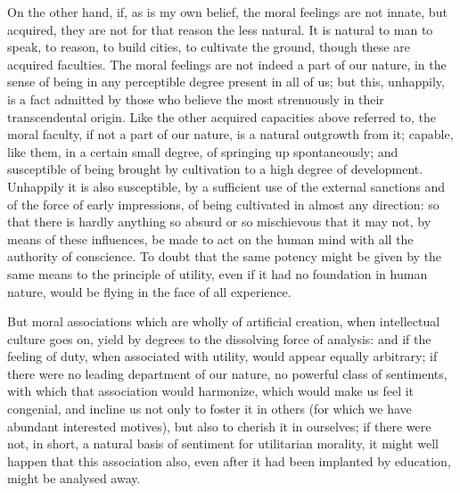 \documentclass[12pt]{report}
\begin{document}
On the other hand, if, as is my own belief, the moral feelings are not innate, but acquired, they are not for that reason the less natural. It is natural to man to speak, to reason, to build cities, to cultivate the ground, though these are acquired faculties. The moral feelings are not indeed a part of our nature, in the sense of being in any perceptible degree present in all of us; but this, unhappily, is a fact admitted by those who believe the most strenuously in their transcendental origin. Like the other acquired capacities above referred to, the moral faculty, if not a part of our nature, is a natural outgrowth from it; capable, like them, in a certain small degree, of springing up spontaneously; and susceptible of being brought by cultivation to a high degree of development. Unhappily it is also susceptible, by a sufficient use of the external sanctions and of the force of early impressions, of being cultivated in almost any direction: so that there is hardly anything so absurd or so mischievous that it may not, by means of these influences, be made to act on the human mind with all the authority of conscience. To doubt that the same potency might be given by the same means to the principle of utility, even if it had no foundation in human nature, would be flying in the face of all experience.

But moral associations which are wholly of artificial creation, when intellectual culture goes on, yield by degrees to the dissolving force of analysis: and if the feeling of duty, when associated with utility, would appear equally arbitrary; if there were no leading department of our nature, no powerful class of sentiments, with which that association would harmonize, which would make us feel it congenial, and incline us not only to foster it in others (for which we have abundant interested motives), but also to cherish it in ourselves; if there were not, in short, a natural basis of sentiment for utilitarian morality, it might well happen that this association also, even after it had been implanted by education, might be analysed away.
\end{document}

